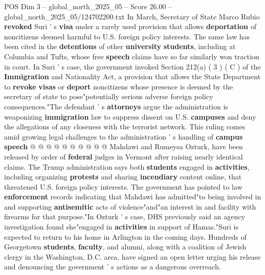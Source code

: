 \begin{textsample}{POS Dim 3 – global\_north\_2025\_05 – Score 26.00 – global\_north\_2025\_05/124702200.txt}
In March, Secretary of State Marco Rubio \textbf{revoked} Suri ' s \textbf{visa} under a rarely used provision that allows \textbf{deportation} of noncitizens deemed harmful to U.S. foreign policy interests.
The same law has been cited in the \textbf{detentions} of other \textbf{university} \textbf{students}, including at Columbia and Tufts, whose free \textbf{speech} claims have so far similarly won traction in court.
In Suri ' s case, the government invoked Section 212(a) ( 3 ) ( C ) of the \textbf{Immigration} and Nationality Act, a provision that allows the State Department to \textbf{revoke} \textbf{visas} or \textbf{deport} noncitizens whose presence is deemed by the secretary of state to pose"potentially serious adverse foreign policy consequences."The defendant ' s \textbf{attorneys} argue the administration is weaponizing \textbf{immigration} law to suppress dissent on U.S. \textbf{campuses} and deny the allegations of any closeness with the terrorist network.
This ruling comes amid growing legal challenges to the administration ' s handling of \textbf{campus} \textbf{speech} @ @ @ @ @ @ @ @ @ @ Mahdawi and Rumeysa Ozturk, have been released by order of \textbf{federal} judges in Vermont after raising nearly identical claims.
The Trump administration says both \textbf{students} engaged in \textbf{activities}, including organizing \textbf{protests} and sharing \textbf{incendiary} content online, that threatened U.S. foreign policy interests.
The government has pointed to law \textbf{enforcement} records indicating that Mahdawi has admitted"to being involved in and supporting \textbf{antisemitic} acts of violence"and"an interest in and facility with firearms for that purpose."In Ozturk ' s case, DHS previously said an agency investigation found she"engaged in \textbf{activities} in support of Hamas."Suri is expected to return to his home in Arlington in the coming days.
Hundreds of Georgetown \textbf{students}, \textbf{faculty}, and alumni, along with a coalition of Jewish clergy in the Washington, D.C. area, have signed an open letter urging his release and denouncing the government ' s actions as a dangerous overreach.

\end{textsample}
